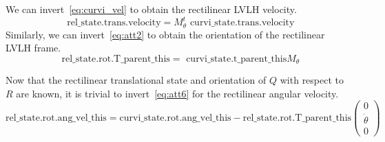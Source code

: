 We can invert~\ref{eq:curvi_vel} to obtain the rectilinear LVLH velocity.
\begin{equation}
\mbox{~rel\_state.trans.velocity} =
M^t_\theta\mbox{~curvi\_state.trans.velocity}
\label{eq:recti_vel}
\end{equation}
Similarly, we can invert~\ref{eq:att2} to obtain the orientation of the
rectilinear LVLH frame.
\begin{equation}
\mbox{~rel\_state.rot.T\_parent\_this} =
\mbox{~curvi\_state.t\_parent\_this}M_\theta
\label{eq:recti_rot}
\end{equation}

Now that the rectilinear translational state and orientation of $Q$ with
respect to $R$ are known, it is trivial to invert~\ref{eq:att6} for the
rectilinear angular velocity.
\begin{equation}
\mbox{rel\_state.rot.ang\_vel\_this} = \mbox{curvi\_state.rot.ang\_vel\_this} -
\mbox{rel\_state.rot.T\_parent\_this} \left ( \begin {array}{c}
0 \\ \dot\theta \\ 0 \end{array}\right )
\label{eq:recti_ang_vel}
\end{equation}
